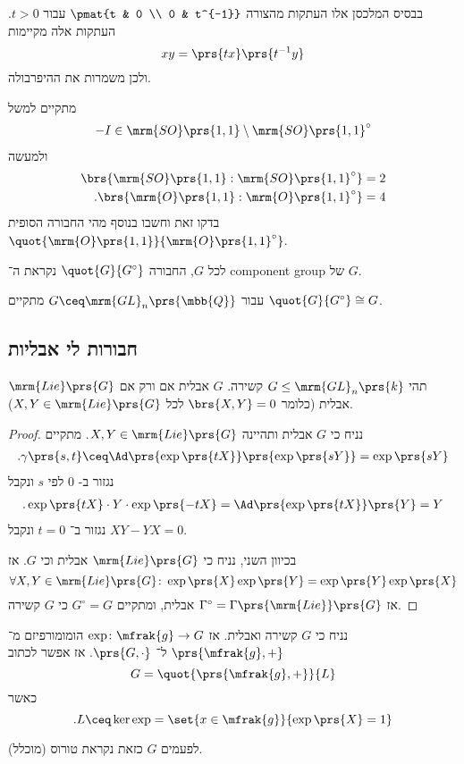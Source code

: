 \documentclass[10pt, twoside]{book}
\newcommand{\textenglish}[1]{\foreignlanguage{english}{#1}}
\begin{document}
\begin{example}
בבסיס המלכסן אלו העתקות מהצורה
$\pmat{t & 0 \\ 0 & t^{-1}}$
עבור
$t > 0$.
העתקות אלה מקיימות
\[xy = \prs{tx}\prs{t^{-1}y}\]
ולכן משמרות את ההיפרבולה.

מתקיים למשל
\begin{align*}
-I \in \mrm{SO}\prs{1,1} \setminus \mrm{SO}\prs{1,1}^\circ
\end{align*}
ולמעשה
\begin{align*}
\brs{\mrm{SO}\prs{1,1} : \mrm{SO}\prs{1,1}^\circ} &= 2 \\
\text{.}\brs{\mrm{O}\prs{1,1} : \mrm{O}\prs{1,1}^\circ} &= 4
\end{align*}
בדקו זאת וחשבו בנוסף מהי החבורה הסופית
$\quot{\mrm{O}\prs{1,1}}{\mrm{O}\prs{1,1}^\circ}$.
\end{example}

\begin{definition}
לכל
$G$,
החבורה
$\quot{G}{G^\circ}$
נקראת ה־%
\textenglish{component group}
של
$G$.
\end{definition}

\begin{example}
עבור
$G \ceq \mrm{GL}_n\prs{\mbb{Q}}$
מתקיים
$\quot{G}{G^\circ} \cong G$.
\end{example}

\subsection{חבורות לי אבליות}

\begin{proposition}
תהי
$G \leq \mrm{GL}_n\prs{k}$
קשירה.
$G$
אבלית אם ורק אם
$\mrm{Lie}\prs{G}$
אבלית (כלומר
$\brs{X,Y} = 0$
לכל
$X,Y \in \mrm{Lie}\prs{G}$).
\end{proposition}

\begin{proof}
נניח כי
$G$
אבלית ותהיינה
$X,Y \in \mrm{Lie}\prs{G}$.
מתקיים
\begin{align*}
\text{.} \gamma\prs{s,t} \ceq \Ad\prs{\exp\prs{tX}} \prs{\exp\prs{sY}} = \exp\prs{sY}
\end{align*}
נגזור ב-%
$0$
לפי
$s$
ונקבל
\begin{align*}
\text{.} \exp\prs{tX} \cdot Y \cdot \exp\prs{-tX} = \Ad\prs{\exp\prs{tX}}\prs{Y} = Y
\end{align*}
נגזור ב־%
$t = 0$
ונקבל
$XY - YX = 0$.

בכיוון השני, נניח כי
$\mrm{Lie}\prs{G}$
אבלית וכי
$G$.
אז
\[\forall X,Y \in \mrm{Lie}\prs{G} \colon \exp\prs{X} \exp\prs{Y} = \exp\prs{Y}\exp\prs{X}\]
אז
$\Gamma^\circ =\Gamma\prs{\mrm{Lie}}\prs{G}$
אבלית, ומתקיים
$G^\circ = G$
כי
$G$
קשירה.
\end{proof}

\begin{remark}
נניח כי
$G$
קשירה ואבלית. אז
$\exp \colon \mfrak{g} \to G$
הומומורפיזם מ־%
$\prs{\mfrak{g}, +}$
ל־%
$\prs{G, \cdot}$.
אז אפשר לכתוב
\[G = \quot{\prs{\mfrak{g}, +}}{L}\]
כאשר
\[\text{.} L \ceq \ker \exp = \set{x \in \mfrak{g}}{\exp\prs{X} = 1}\]

לפעמים
$G$
כזאת נקראת טורוס (מוכלל).
\end{remark}
\end{document}
